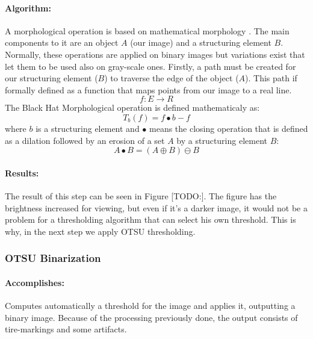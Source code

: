 \paragraph*{Algorithm:}\mbox{}\par
A morphological operation is based on mathematical morphology \cite{article:mathematical-morphology}. The main components to it are an object $A$ (our image) and a structuring element $B$. Normally, these operations are applied on binary images but variations exist that let them to be used also on gray-scale ones. Firstly, a path must be created for our structuring element ($B$) to traverse the edge of the object ($A$). This path if formally defined as a function that maps points from our image to a real line.
\[f:E \rightarrow R\]
The Black Hat Morphological operation is defined mathematicaly as:
\[T_b(f) = f \bullet b - f\]
where $b$ is a structuring element and $\bullet$ means the closing operation that is defined as a dilation followed by an erosion of a set $A$ by a structuring element $B$:
\[A \bullet B = (A \oplus B) \ominus B\]

\paragraph*{Results:}\mbox{}\par
The result of this step can be seen in Figure [TODO:]. The figure has the brightness increased for viewing, but even if it's a darker image, it would not be a problem for a thresholding algorithm that can select his own threshold. This is why, in the next step we apply OTSU thresholding.

\subsubsection{OTSU Binarization}
\label{subsubsec:OTSU-binarization}

\paragraph*{Accomplishes:}\mbox{}\par
Computes automatically a threshold for the image and applies it, outputting a binary image. Because of the processing previously done, the output consists of tire-markings and some artifacts.

